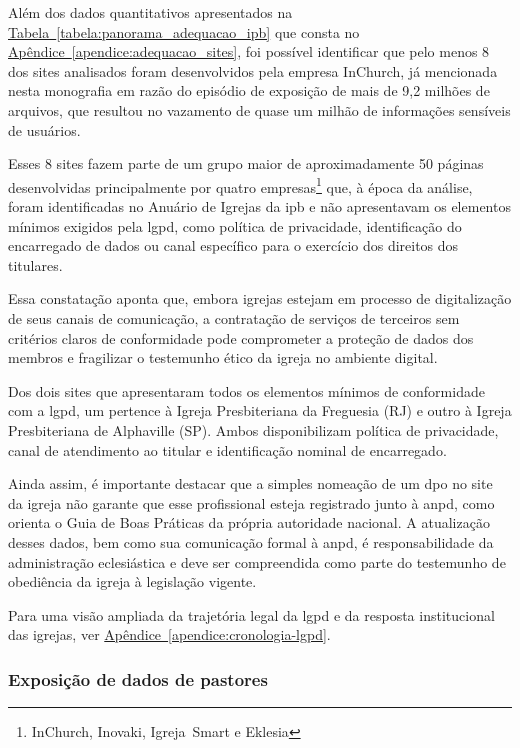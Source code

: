 Além dos dados quantitativos apresentados na \hyperref[tabela:panorama_adequacao_ipb]{Tabela~\ref*{tabela:panorama_adequacao_ipb}} que consta no \hyperref[apendice:adequacao_sites]{Apêndice~\ref*{apendice:adequacao_sites}}, foi possível identificar que pelo menos 8 dos sites analisados foram desenvolvidos pela empresa \mbox{InChurch}, já mencionada nesta monografia em razão do episódio de exposição de mais de 9,2 milhões de arquivos, que resultou no vazamento de quase um milhão de informações sensíveis de usuários\cite{almeida_inchurch_2024}.

Esses 8 sites fazem parte de um grupo maior de aproximadamente 50 páginas desenvolvidas principalmente por quatro empresas\footnote{\mbox{InChurch}, \mbox{Inovaki}, \mbox{Igreja Smart} e \mbox{Eklesia}} que, à época da análise, foram identificadas no Anuário de Igrejas da \gls{ipb} e não apresentavam os elementos mínimos exigidos pela \gls{lgpd}, como política de privacidade, identificação do encarregado de dados ou canal específico para o exercício dos direitos dos titulares.

Essa constatação aponta que, embora igrejas estejam em processo de digitalização de seus canais de comunicação, a contratação de serviços de terceiros sem critérios claros de conformidade pode comprometer a proteção de dados dos membros e fragilizar o testemunho ético da igreja no ambiente digital.

Dos dois sites que apresentaram todos os elementos mínimos de conformidade com a \gls{lgpd}, um pertence à Igreja Presbiteriana da Freguesia (RJ) e outro à Igreja Presbiteriana de Alphaville (SP). Ambos disponibilizam política de privacidade, canal de atendimento ao titular e identificação nominal de encarregado.

Ainda assim, é importante destacar que a simples nomeação de um \gls{dpo} no site da igreja não garante que esse profissional esteja registrado junto à \gls{anpd}, como orienta o Guia de Boas Práticas da própria autoridade nacional. A atualização desses dados, bem como sua comunicação formal à \gls{anpd}, é responsabilidade da administração eclesiástica e deve ser compreendida como parte do testemunho de obediência da igreja à legislação vigente.

Para uma visão ampliada da trajetória legal da \gls{lgpd} e da resposta institucional das igrejas, ver \hyperref[apendice:cronologia-lgpd]{Apêndice~\ref*{apendice:cronologia-lgpd}}.

\subsubsection{Exposição de dados de pastores}

